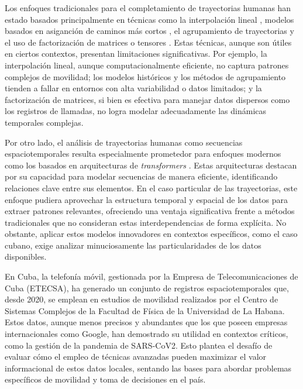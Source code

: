 Los enfoques tradicionales para el completamiento de trayectorias humanas han estado basados principalmente en técnicas como la interpolación lineal \cite{hoteit2014estimating}, modelos basados en asiganción de caminos más cortos \cite{st2014reconstructing}, el agrupamiento de trayectorias \cite{partsinevelos2005reconstructing} y el uso de factorización de matrices o tensores \cite{chen2019complete}. Estas técnicas, aunque son útiles en ciertos contextos, presentan limitaciones significativas. Por ejemplo, la interpolación lineal, aunque computacionalmente eficiente, no captura patrones complejos de movilidad; los modelos históricos y los métodos de agrupamiento tienden a fallar en entornos con alta variabilidad o datos limitados; y la factorización de matrices, si bien es efectiva para manejar datos dispersos como los registros de llamadas, no logra modelar adecuadamente las dinámicas temporales complejas.

Por otro lado, el análisis de trayectorias humanas como secuencias espaciotemporales resulta especialmente prometedor para enfoques modernos como los basados en arquitecturas de \textit{transformers} \cite{vaswani2017attention}. Estas arquitecturas destacan por su capacidad para modelar secuencias de manera eficiente, identificando relaciones clave entre sus elementos. En el caso particular de las trayectorias, este enfoque pudiera aprovechar la estructura temporal y espacial de los datos para extraer patrones relevantes, ofreciendo una ventaja significativa frente a métodos tradicionales que no consideran estas interdependencias de forma explícita. No obstante, aplicar estos modelos innovadores en contextos específicos, como el caso cubano, exige analizar minuciosamente las particularidades de los datos disponibles.

En Cuba, la telefonía móvil, gestionada por la Empresa de Telecomunicaciones de Cuba (ETECSA), ha generado un conjunto de registros espaciotemporales que, desde 2020, se emplean en estudios de movilidad realizados por el Centro de Sistemas Complejos de la Facultad de Física de la Universidad de La Habana. Estos datos, aunque menos precisos y abundantes que los que poseen empresas internacionales como Google, han demostrado su utilidad en contextos críticos, como la gestión de la pandemia de SARS-CoV2. Esto plantea el desafío de evaluar cómo el empleo de técnicas avanzadas pueden maximizar el valor informacional de estos datos locales, sentando las bases para abordar problemas específicos de movilidad y toma de decisiones en el país.

